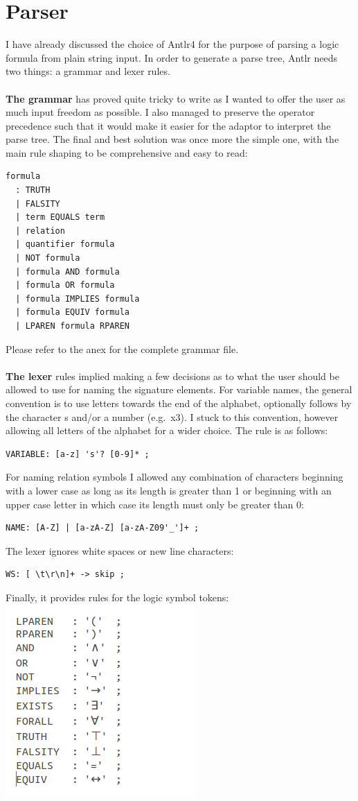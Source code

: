 \documentclass{report}
\begin{document}
\section{Parser}
I have already discussed the choice of Antlr4 for the purpose of parsing a logic 
formula from plain string input. In order to generate a parse tree, Antlr needs 
two things: a grammar and lexer rules. 
\\ \\
\textbf{The grammar} has proved quite tricky to write as I wanted to offer the 
user as much input freedom as possible. I also managed to preserve the operator 
precedence such that it would make it easier for the adaptor to interpret the 
parse tree. The final and best solution was once more the simple one, with the 
main rule shaping to be comprehensive and easy to read:
\begin{verbatim}
formula
  : TRUTH
  | FALSITY
  | term EQUALS term
  | relation
  | quantifier formula
  | NOT formula
  | formula AND formula
  | formula OR formula 
  | formula IMPLIES formula
  | formula EQUIV formula 
  | LPAREN formula RPAREN
\end{verbatim}
Please refer to the anex for the complete grammar file. 
\\ \\
\textbf{The lexer} rules implied making a few decisions as to what the user 
should be allowed to use for naming the signature elements. For variable names, 
the general convention is to use letters towards the end of the alphabet, 
optionally follows by the character s and/or a number (e.g.\ x3). I stuck to 
this convention, however allowing all letters of the alphabet for a wider 
choice. The rule is as follows:
\begin{verbatim}
VARIABLE: [a-z] 's'? [0-9]* ;
\end{verbatim}
For naming relation symbols I allowed any combination of characters beginning 
with a lower case as long as its length is greater than 1 or beginning with an 
upper case letter in which case its length must only be greater than 0:
\begin{verbatim}
NAME: [A-Z] | [a-zA-Z] [a-zA-Z09'_']+ ;
\end{verbatim}
The lexer ignores white spaces or new line characters:
\begin{verbatim}
WS: [ \t\r\n]+ -> skip ;
\end{verbatim}
Finally, it provides rules for the logic symbol tokens:\\
\includegraphics[scale=0.5]{tokens.png}\\
\end{document}
